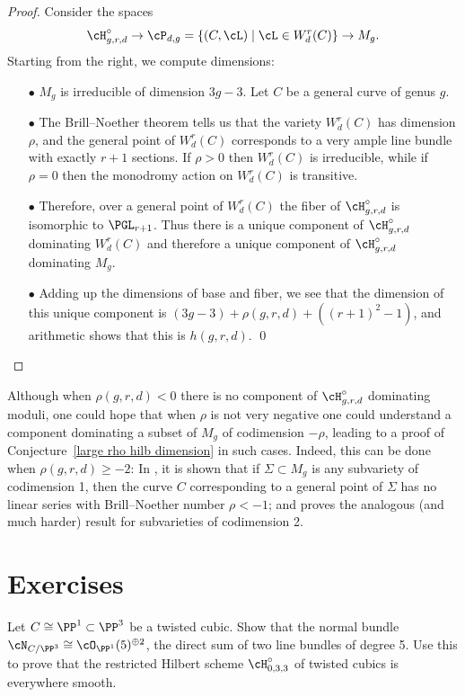 \begin{proof}
Consider the spaces
$$
\cH^\circ_{g,r,d}
\to
\cP_{d,g} = \{(C,\cL) \mid \cL \in W^r_d(C) \}
\to
M_g.
$$
Starting from the right, we compute dimensions:

\begin{enumerate}

\item[$\bullet$]  $M_g$ is irreducible of dimension $3g-3$. Let $C$
be a general curve of genus $g$.

\item[$\bullet$]
The Brill--Noether theorem tells us that the variety $W^r_d(C)$ has
dimension $\rho$, and the general point of $W^r_d(C)$ corresponds to a
very ample line bundle with exactly $r+1$ sections.
If $\rho>0$ then $W^r_d(C)$ is irreducible, while if $\rho = 0$ then
the monodromy action on $W^r_d(C)$
is transitive.

\item[$\bullet$] Therefore, over a general point of $W^r_d(C)$ the fiber
of $\cH^\circ_{g,r,d} $ is
isomorphic to $\PGL_{r+1}$. Thus there is a unique component of
$\cH^\circ_{g,r,d}$ dominating
$W^r_d(C)$ and therefore a unique component of $\cH^\circ_{g,r,d}$
dominating $M_g$.

\item[$\bullet$] Adding up the dimensions of base and fiber, we see that
the dimension
of this unique component is $(3g-3)+\rho(g,r,d) +((r+1)^2-1)$,
and arithmetic shows that this is $h(g,r,d)$.
\qed
\end{enumerate}
\let\qed\relax
\end{proof}

\begin{fact}\label{Hilb with rho geq -2}
 Although when $\rho(g,r,d)<0$ there is no component of
 $\cH^{\circ}_{g,r,d}$ dominating moduli, one could hope
that when $\rho$ is not very negative one could understand a component
dominating a subset of $M_{g}$ of codimension $-\rho$, leading to a
proof of Conjecture~\ref{large rho hilb dimension} in such cases.
Indeed, this can be done when $\rho(g,r,d)\geq -2$:
In \cite{BrillNoether-1}, it is shown that if $\Sigma \subset M_g$
is any subvariety of codimension 1, then the curve $C$ corresponding
to a general point of $\Sigma$ has no linear series with Brill--Noether
number $\rho < -1$; and
 \cite{Edidin} proves the analogous
(and much harder) result for subvarieties of codimension 2.
\end{fact}


\section{Exercises}
\begin{exercise}\label{twisted cubic normal bundle}
Let $C \cong \PP^1 \subset \PP^3$ be a twisted cubic. Show that the normal
bundle $\cN_{C/\PP^3} \cong \cO_{\PP^1}(5)^{\oplus 2}$, the direct sum
of two line bundles of degree 5. Use this to prove that the restricted
Hilbert scheme $\cH^\circ_{0,3,3}$ of twisted cubics is everywhere
%
smooth.
\end{exercise}

